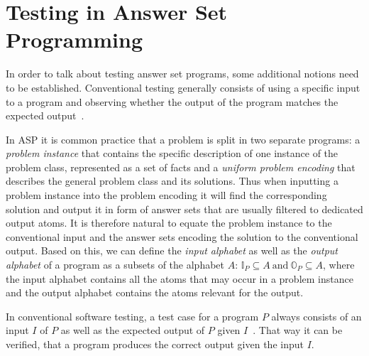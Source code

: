 \section{Testing in Answer Set Programming}
\label{sec:Preliminaries on answer set programming/Testing in Answer Set Programming}
In order to talk about testing answer set programs, some additional notions need to be established. Conventional testing generally consists of using a specific input to a program and observing whether the output of the program matches the expected output~\cite[71\psqq]{AO16}.

In ASP it is common practice that a problem is split in two separate programs: a \emph{problem instance} that contains the specific description of one instance of the problem class, represented as a set of facts and a \emph{uniform problem encoding} that describes the general problem class and its solutions. Thus when inputting a problem instance into the problem encoding it will find the corresponding solution and output it in form of answer sets that are usually filtered to dedicated output atoms. It is therefore natural to equate the problem instance to the conventional input and the answer sets encoding the solution to the conventional output. Based on this, we can define the \emph{input alphabet} as well as the \emph{output alphabet} of a program as a subsets of the alphabet $A$: \(\mathbb{I}_P \subseteq A\ \text{and}\ \mathbb{O}_P \subseteq A\), where the input alphabet contains all the atoms that may occur in a problem instance and the output alphabet contains the atoms relevant for the output.

In conventional software testing, a test case for a program $P$ always consists of an input $I$ of $P$ as well as the expected output of $P$ given $I$~\cite{MB11}. That way it can be verified, that a program produces the correct output given the input $I$.

